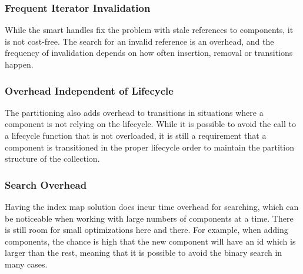 \subsubsection{Frequent Iterator Invalidation}
While the smart handles fix the problem with stale references to components, it is not cost-free.
The search for an invalid reference is an overhead, and the frequency of invalidation depends on how often insertion,
removal or transitions happen.

\subsubsection{Overhead Independent of Lifecycle}
The partitioning also adds overhead to transitions in situations where a component is not relying on the lifecycle.
While it is possible to avoid the call to a lifecycle function that is not overloaded, it is still a requirement that a component is transitioned in the proper lifecycle order to maintain the partition structure of the collection.

\subsubsection{Search Overhead}
Having the index map solution does incur time overhead for searching, which can be noticeable when working with
large numbers of components at a time.
There is still room for small optimizations here and there. For example, when adding components,
the chance is high that the new component will have an id which is larger than the rest,
meaning that it is possible to avoid the binary search in many cases.
